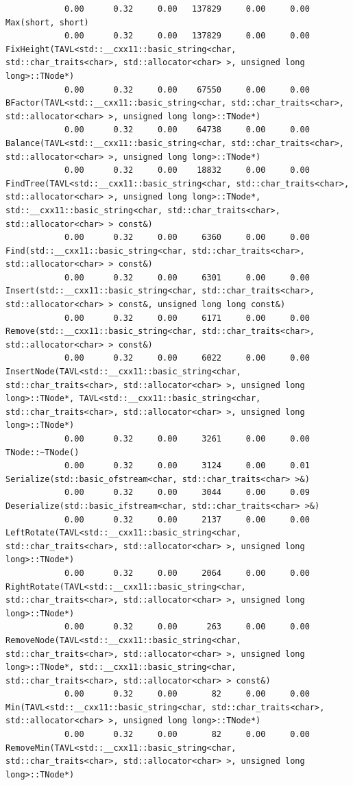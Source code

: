 \documentclass[12pt]{article}
\begin{document}
\begin{small}
\begin{verbatim}
			0.00      0.32     0.00   137829     0.00     0.00  Max(short, short)
			0.00      0.32     0.00   137829     0.00     0.00  FixHeight(TAVL<std::__cxx11::basic_string<char, std::char_traits<char>, std::allocator<char> >, unsigned long long>::TNode*)
			0.00      0.32     0.00    67550     0.00     0.00  BFactor(TAVL<std::__cxx11::basic_string<char, std::char_traits<char>, std::allocator<char> >, unsigned long long>::TNode*)
			0.00      0.32     0.00    64738     0.00     0.00  Balance(TAVL<std::__cxx11::basic_string<char, std::char_traits<char>, std::allocator<char> >, unsigned long long>::TNode*)
			0.00      0.32     0.00    18832     0.00     0.00  FindTree(TAVL<std::__cxx11::basic_string<char, std::char_traits<char>, std::allocator<char> >, unsigned long long>::TNode*, std::__cxx11::basic_string<char, std::char_traits<char>, std::allocator<char> > const&)
			0.00      0.32     0.00     6360     0.00     0.00  Find(std::__cxx11::basic_string<char, std::char_traits<char>, std::allocator<char> > const&)
			0.00      0.32     0.00     6301     0.00     0.00  Insert(std::__cxx11::basic_string<char, std::char_traits<char>, std::allocator<char> > const&, unsigned long long const&)
			0.00      0.32     0.00     6171     0.00     0.00  Remove(std::__cxx11::basic_string<char, std::char_traits<char>, std::allocator<char> > const&)
			0.00      0.32     0.00     6022     0.00     0.00  InsertNode(TAVL<std::__cxx11::basic_string<char, std::char_traits<char>, std::allocator<char> >, unsigned long long>::TNode*, TAVL<std::__cxx11::basic_string<char, std::char_traits<char>, std::allocator<char> >, unsigned long long>::TNode*)
			0.00      0.32     0.00     3261     0.00     0.00  TNode::~TNode()
			0.00      0.32     0.00     3124     0.00     0.01  Serialize(std::basic_ofstream<char, std::char_traits<char> >&)
			0.00      0.32     0.00     3044     0.00     0.09  Deserialize(std::basic_ifstream<char, std::char_traits<char> >&)
			0.00      0.32     0.00     2137     0.00     0.00  LeftRotate(TAVL<std::__cxx11::basic_string<char, std::char_traits<char>, std::allocator<char> >, unsigned long long>::TNode*)
			0.00      0.32     0.00     2064     0.00     0.00  RightRotate(TAVL<std::__cxx11::basic_string<char, std::char_traits<char>, std::allocator<char> >, unsigned long long>::TNode*)
			0.00      0.32     0.00      263     0.00     0.00  RemoveNode(TAVL<std::__cxx11::basic_string<char, std::char_traits<char>, std::allocator<char> >, unsigned long long>::TNode*, std::__cxx11::basic_string<char, std::char_traits<char>, std::allocator<char> > const&)
			0.00      0.32     0.00       82     0.00     0.00  Min(TAVL<std::__cxx11::basic_string<char, std::char_traits<char>, std::allocator<char> >, unsigned long long>::TNode*)
			0.00      0.32     0.00       82     0.00     0.00  RemoveMin(TAVL<std::__cxx11::basic_string<char, std::char_traits<char>, std::allocator<char> >, unsigned long long>::TNode*)
			
		\end{verbatim}
	\end{small}
	
\end{document}
